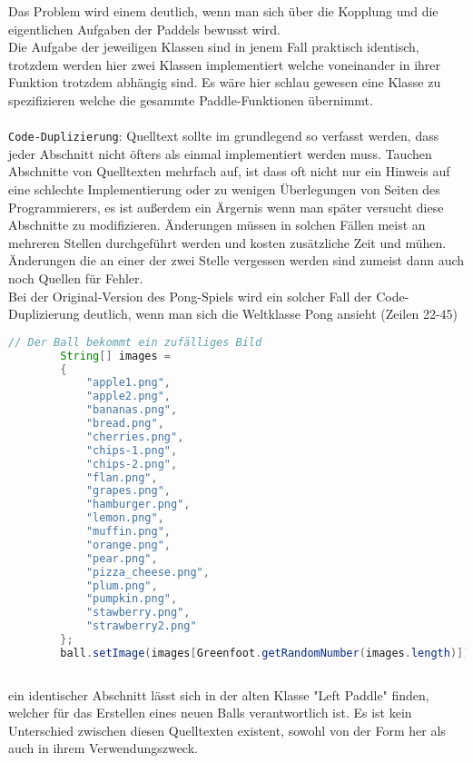 \documentclass{pi1}
\begin{document}
Das Problem wird einem deutlich, wenn man sich über die Kopplung und die eigentlichen Aufgaben der Paddels bewusst wird.\\
Die Aufgabe der jeweiligen Klassen sind in jenem Fall praktisch identisch, trotzdem werden hier zwei Klassen implementiert welche voneinander in ihrer Funktion trotzdem abhängig sind.
Es wäre hier schlau gewesen eine Klasse zu spezifizieren welche die gesammte Paddle-Funktionen übernimmt.\\
\\
\texttt{Code-Duplizierung}:
Quelltext sollte im grundlegend so verfasst werden, dass jeder Abschnitt nicht öfters als einmal implementiert werden muss. Tauchen Abschnitte von Quelltexten mehrfach auf, ist dass oft nicht nur ein Hinweis auf eine schlechte Implementierung oder zu wenigen Überlegungen von Seiten des Programmierers, es ist außerdem ein Ärgernis wenn man später versucht diese Abschnitte zu modifizieren. Änderungen müssen in solchen Fällen meist an mehreren Stellen durchgeführt werden und kosten zusätzliche Zeit und mühen.
Änderungen die an einer der zwei Stelle vergessen werden sind zumeist dann auch noch Quellen für Fehler.\\
Bei der Original-Version des Pong-Spiels wird ein solcher Fall der Code-Duplizierung deutlich, wenn man sich die Weltklasse Pong ansieht (Zeilen 22-45)
\begin{lstlisting}[caption={ Ausschnitt der Pong() Methode der Klasse Pong}, firstnumber=22, language=Java]
        // Der Ball bekommt ein zufälliges Bild
        String[] images =
        {
            "apple1.png",
            "apple2.png",
            "bananas.png",
            "bread.png",
            "cherries.png",
            "chips-1.png",
            "chips-2.png",
            "flan.png",
            "grapes.png",
            "hamburger.png",
            "lemon.png",
            "muffin.png",
            "orange.png",
            "pear.png",
            "pizza_cheese.png",
            "plum.png",
            "pumpkin.png",
            "stawberry.png",
            "strawberry2.png"
        };
        ball.setImage(images[Greenfoot.getRandomNumber(images.length)]);
    
\end{lstlisting}
ein identischer Abschnitt lässt sich in der alten Klasse "Left Paddle" finden, welcher für das Erstellen eines neuen Balls verantwortlich ist.
Es ist kein Unterschied zwischen diesen Quelltexten existent, sowohl von der Form her als auch in ihrem Verwendungszweck.\\
\end{document}
